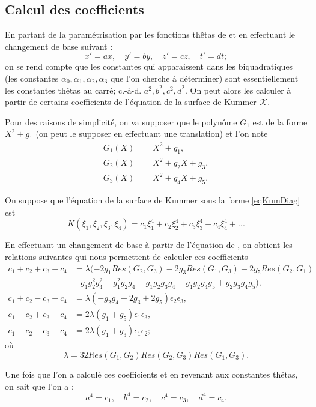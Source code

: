 \documentclass[a4paper,12pt]{article}
\theoremstyle{definition}
\theoremstyle{remark}
\numberwithin{equation}{section}
\begin{document}
\subsection{Calcul des coefficients}

En partant de la paramétrisation par les fonctions thêtas de \citep{gaudry} et en effectuant le changement de base suivant :
$$x'=ax, \quad y'=by, \quad z'=cz, \quad t'=dt;$$
on se rend compte que les constantes qui apparaissent dans les biquadratiques (les constantes $\alpha_0,\alpha_1,\alpha_2,\alpha_3$ que l'on cherche à déterminer) sont essentiellement les constantes thêtas au carré; c.-à-d. $a^2,b^2,c^2,d^2$. On peut alors les calculer à partir de certains coefficients de l'équation de la surface de Kummer $\mathcal{K}$.

Pour des raisons de simplicité, on va supposer que le polynôme $G_1$ est de la forme $X^2 + g_1$ (on peut le supposer en effectuant une translation) et l'on note
\begin{align*}
G_1(X) &= X^2 + g_1, \\
G_2(X) &= X^2+g_2X+g_3, \\
G_3(X) &= X^2+g_4X+g_5.
\end{align*}

On suppose que l'équation de la surface de Kummer sous la forme \ref{eqKumDiag} est
$$K(\xi_1,\xi_2,\xi_3,\xi_4) = c_1\xi^4_1 + c_2\xi^4_2 + c_3\xi^4_3 + c_4\xi^4_4 + ...$$ 

En effectuant un \href{run:./chgBase.sag}{changement de base} à partir de l'équation de \citep{eqKum}, on obtient les relations suivantes qui nous permettent de calculer ces coefficients
\begin{align*}
c_1+c_2+c_3+c_4 &= \lambda(-2g_1Res(G_2,G_3)-2g_3Res(G_1,G_3)-2g_5Res(G_2,G_1) \\
 &+ g_1g_2^2g_4^2 + g_1^2g_2g_4 - g_1g_2g_3g_4 - g_1g_2g_4g_5 + g_2g_3g_4g_5), \\
c_1+c_2-c_3-c_4 &= \lambda(-g_2g_4+2g_3+2g_5)\epsilon_2\epsilon_3, \\
c_1-c_2+c_3-c_4 &= 2\lambda(g_1+g_5)\epsilon_1\epsilon_3, \\
c_1-c_2-c_3+c_4 &= 2\lambda(g_1+g_3)\epsilon_1\epsilon_2;
\end{align*}
où
$$\lambda = 32Res(G_1,G_2)Res(G_2,G_3)Res(G_1,G_3).$$

Une fois que l'on a calculé ces coefficients et en revenant aux constantes thêtas, on sait que l'on a :
$$a^4 = c_1, \quad b^4 = c_2, \quad c^4 = c_3, \quad d^4 = c_4.$$
\end{document}

